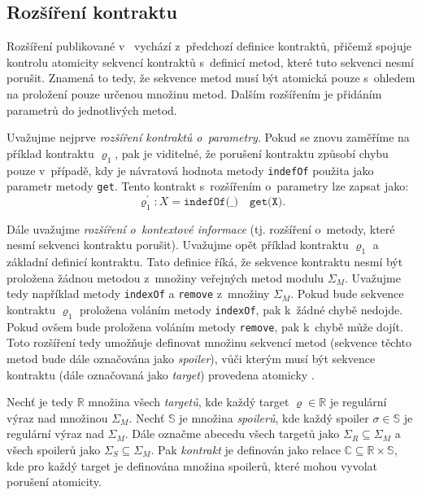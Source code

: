 \subsection{Rozšíření kontraktu}\label{contract_def_ext}

Rozšíření publikované v~\cite{cite:contract2} vychází z~předchozí definice kontraktů, přičemž spojuje kontrolu atomicity sekvencí kontraktů s~definicí metod, které tuto sekvenci nesmí porušit. Znamená to tedy, že sekvence metod musí být atomická pouze s~ohledem na proložení pouze určenou množinu metod. Dalším rozšířením je přidáním parametrů do jednotlivých metod. 

Uvažujme nejprve \textit{rozšíření kontraktů o~parametry}. Pokud se znovu zaměříme na příklad kontraktu $\varrho_1$, pak je viditelné, že porušení kontraktu způsobí chybu pouze v~případě, kdy je návratová hodnota metody \texttt{indefOf} použita jako parametr metody \texttt{get}. Tento kontrakt s~rozšířením o~parametry lze zapsat jako:
$$\varrho_1^\prime: X = \texttt{indefOf(\_)} \quad \texttt{get(X)}.$$

Dále uvažujme \textit{rozšíření o~kontextové informace} (tj. rozšíření o~metody, které nesmí sekvenci kontraktu porušit). Uvažujme opět příklad kontraktu $\varrho_1$ a základní definicí kontraktu. Tato definice říká, že sekvence kontraktu nesmí být proložena žádnou metodou z~množiny veřejných metod modulu $\Sigma_M$. Uvažujme tedy například metody \texttt{indexOf} a \texttt{remove} z~množiny $\Sigma_M$. Pokud bude sekvence kontraktu $\varrho_1$ proložena voláním metody \texttt{indexOf}, pak k~žádné chybě nedojde. Pokud ovšem bude proložena voláním metody \texttt{remove}, pak k~chybě může dojít. Toto rozšíření tedy umožňuje definovat množinu sekvencí metod (sekvence těchto metod bude dále označována jako \textit{spoiler}), vůči kterým musí být sekvence kontraktu (dále označovaná jako \textit{target}) provedena atomicky \cite{cite:contract2}.

Nechť je tedy $\mathbb{R}$ množina všech \textit{targetů}, kde každý target $\varrho \in \mathbb{R}$ je regulární výraz nad množinou $\Sigma_M$. Nechť $\mathbb{S}$ je množina \textit{spoilerů}, kde každý spoiler $\sigma \in \mathbb{S}$ je regulární výraz nad $\Sigma_M$. Dále označme abecedu všech targetů jako $\Sigma_R \subseteq \Sigma_M$ a všech spoilerů jako $\Sigma_S \subseteq \Sigma_M$. Pak \textit{kontrakt} je definován jako relace $\mathbb{C} \subseteq \mathbb{R} \times \mathbb{S}$, kde pro každý target je definována množina spoilerů, které mohou vyvolat porušení atomicity.

